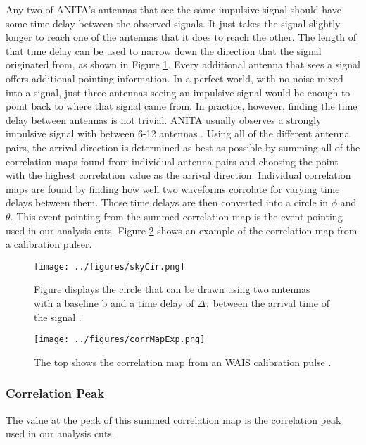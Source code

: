 Any two of ANITA's antennas that see the same impulsive signal should have some time delay between the observed signals.  It just takes the signal slightly longer to reach one of the antennas that it does to reach the other.  The length of that time delay can be used to narrow down the direction that the signal originated from, as shown in Figure \ref{fig:skyCir}.  Every additional antenna that sees a signal offers additional pointing information.  In a perfect world, with no noise mixed into a signal, just three antennas seeing an impulsive signal would be enough to point back to where that signal came from.  In practice, however, finding the time delay between antennas is not trivial.  ANITA usually observes a strongly impulsive signal with between 6-12 antennas \cite{sam}.  Using all of the different antenna pairs, the arrival direction is determined as best as possible by summing all of the correlation maps found from individual antenna pairs and choosing the point with the highest correlation value as the arrival direction.  Individual correlation maps are found by finding how well two waveforms corrolate for varying time delays between them.  Those time delays are then converted into a circle in $\phi$ and $\theta$.  This event pointing from the summed correlation map is the event pointing used in our analysis cuts.  Figure \ref{fig:corMapExp} shows an example of the correlation map from a calibration pulser.

\begin{figure}[h]
\centering
\texttt{[image: ../figures/skyCir.png]}
\caption[Antenna Correlation Circle]{Figure displays the circle that can be drawn using two antennas with a baseline b and a time delay of $\Delta \tau$ between the arrival time of the signal \cite{sam}.}
\label{fig:skyCir}
\end{figure}

\begin{figure}[h]
\centering
\texttt{[image: ../figures/corrMapExp.png]}
\caption[Correlation Map Example]{The top shows the correlation map from an WAIS calibration pulse \cite{sam}.}
\label{fig:corMapExp}
\end{figure}


\subsubsection{Correlation Peak}

The value at the peak of this summed correlation map is the correlation peak used in our analysis cuts.


